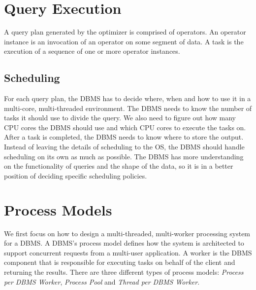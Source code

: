 \documentclass[11pt]{article}
\begin{document}
\maketitle
\thispagestyle{plain}

\section{Query Execution}
A query plan generated by the optimizer is comprised of operators. An operator instance is an 
invocation of an operator on some segment of data. A task is the execution of a sequence of one or 
more operator instances.

\subsection*{Scheduling} 
For each query plan, the DBMS has to decide where, when and how to use it in a multi-core, 
multi-threaded environment. The DBMS needs to know the number of tasks it should use to divide the 
query. We also need to figure out how many CPU cores the DBMS should use and which CPU cores to 
execute the tasks on. After a task is completed, the DBMS needs to know where to store the output. 
Instead of leaving the details of scheduling to the OS, the DBMS should handle scheduling on its own 
as much as possible. The DBMS has more understanding on the functionality of queries and the shape 
of the data, so it is in a better position of deciding specific scheduling policies.

\section{Process Models}
We first focus on how to design a multi-threaded, multi-worker processing system for a DBMS. A 
DBMS's process model defines how the system is architected to support concurrent requests from a 
multi-user application. A worker is the DBMS component that is responsible for executing tasks on 
behalf of the client and returning the results. There are three different types of process models: 
\textit{Process per DBMS Worker}, \textit{Process Pool} and \textit{Thread per DBMS Worker}.
\end{document}
